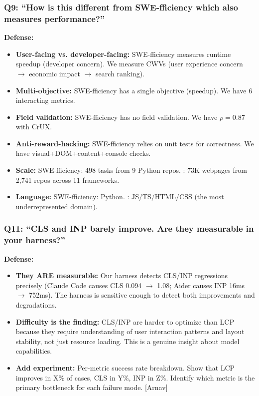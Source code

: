 \subsubsection{Q9: ``How is this different from SWE-fficiency which also measures performance?''}
\textbf{Defense:} 
\begin{itemize}
    \item \textbf{User-facing vs. developer-facing:} SWE-fficiency measures runtime speedup (developer concern). We measure CWVs (user experience concern $\rightarrow$ economic impact $\rightarrow$ search ranking).
    \item \textbf{Multi-objective:} SWE-fficiency has a single objective (speedup). We have 6 interacting metrics.
    \item \textbf{Field validation:} SWE-fficiency has no field validation. We have $\rho = 0.87$ with CrUX.
    \item \textbf{Anti-reward-hacking:} SWE-fficiency relies on unit tests for correctness. We have visual+DOM+content+console checks.
    \item \textbf{Scale:} SWE-fficiency: 498 tasks from 9 Python repos. \OurBench: 73K webpages from 2,741 repos across 11 frameworks.
    \item \textbf{Language:} SWE-fficiency: Python. \OurBench: JS/TS/HTML/CSS (the most underrepresented domain).
\end{itemize}

\subsubsection{Q11: ``CLS and INP barely improve. Are they measurable in your harness?''}
\textbf{Defense:}
\begin{itemize}
    \item \textbf{They ARE measurable:} Our harness detects CLS/INP regressions precisely (Claude Code causes CLS 0.094 $\rightarrow$ 1.08; Aider causes INP 16ms $\rightarrow$ 752ms). The harness is sensitive enough to detect both improvements and degradations.
    \item \textbf{Difficulty is the finding:} CLS/INP are harder to optimize than LCP because they require understanding of user interaction patterns and layout stability, not just resource loading. This is a genuine insight about model capabilities.
    \item \textbf{Add experiment:} Per-metric success rate breakdown. Show that LCP improves in X\% of cases, CLS in Y\%, INP in Z\%. Identify which metric is the primary bottleneck for each failure mode. [Arnav]
\end{itemize}

